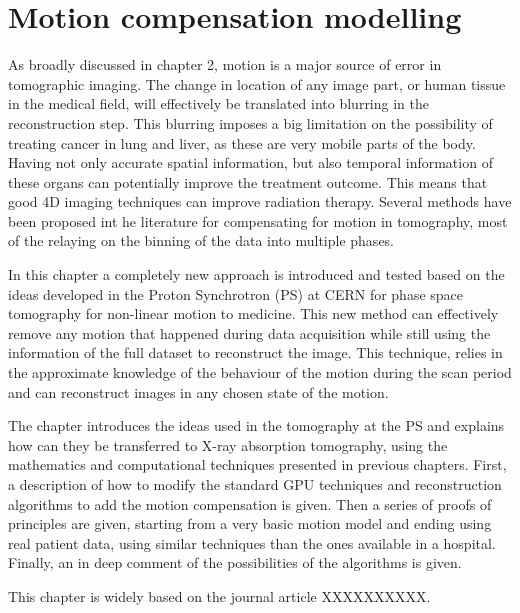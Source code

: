 \chapter{Motion compensation modelling}

As broadly discussed in chapter 2, motion is a major source of error in tomographic imaging. The change in location of any image part, or human tissue in the medical field, will effectively be translated into blurring in the reconstruction step. This blurring imposes a big limitation on the possibility of treating cancer in lung and liver, as these are very mobile parts of the body. Having not only accurate spatial information, but also temporal information of these organs can potentially improve the treatment outcome. This means that good 4D imaging techniques can improve radiation therapy. Several methods have been proposed int he literature for compensating for motion in tomography, most of the relaying on the binning of the data into multiple phases. 

In this chapter a completely new approach is introduced and tested based on the ideas developed in the Proton Synchrotron (PS) at CERN for phase space tomography for non-linear motion to medicine. This new method can effectively remove any motion that happened during data acquisition while still using the information of the full dataset to reconstruct the image. This technique, relies in the approximate knowledge of the behaviour of the motion during the scan period and can reconstruct images in any chosen state of the motion.

The chapter introduces the ideas used in the tomography at the PS and explains how can they be transferred to X-ray absorption tomography, using the mathematics and computational techniques presented in previous chapters. First, a description of how to modify the standard GPU techniques and reconstruction algorithms to add the motion compensation is given. Then a series of proofs of principles are given, starting from a very basic motion model and ending using real patient data, using similar techniques than the ones available in a hospital. Finally, an in deep comment of the possibilities of the algorithms is given.

This chapter is widely based on the journal article XXXXXXXXXX.

